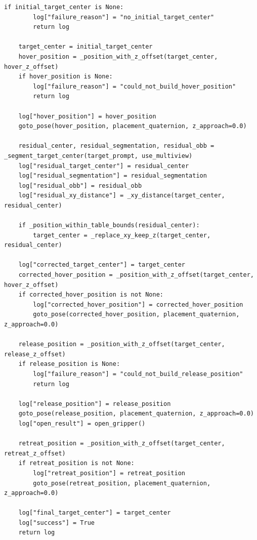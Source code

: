 \begin{lstlisting}[style=ratsappendixpython]
    if initial_target_center is None:
        log["failure_reason"] = "no_initial_target_center"
        return log

    target_center = initial_target_center
    hover_position = _position_with_z_offset(target_center, hover_z_offset)
    if hover_position is None:
        log["failure_reason"] = "could_not_build_hover_position"
        return log

    log["hover_position"] = hover_position
    goto_pose(hover_position, placement_quaternion, z_approach=0.0)

    residual_center, residual_segmentation, residual_obb = _segment_target_center(target_prompt, use_multiview)
    log["residual_target_center"] = residual_center
    log["residual_segmentation"] = residual_segmentation
    log["residual_obb"] = residual_obb
    log["residual_xy_distance"] = _xy_distance(target_center, residual_center)

    if _position_within_table_bounds(residual_center):
        target_center = _replace_xy_keep_z(target_center, residual_center)

    log["corrected_target_center"] = target_center
    corrected_hover_position = _position_with_z_offset(target_center, hover_z_offset)
    if corrected_hover_position is not None:
        log["corrected_hover_position"] = corrected_hover_position
        goto_pose(corrected_hover_position, placement_quaternion, z_approach=0.0)

    release_position = _position_with_z_offset(target_center, release_z_offset)
    if release_position is None:
        log["failure_reason"] = "could_not_build_release_position"
        return log

    log["release_position"] = release_position
    goto_pose(release_position, placement_quaternion, z_approach=0.0)
    log["open_result"] = open_gripper()

    retreat_position = _position_with_z_offset(target_center, retreat_z_offset)
    if retreat_position is not None:
        log["retreat_position"] = retreat_position
        goto_pose(retreat_position, placement_quaternion, z_approach=0.0)

    log["final_target_center"] = target_center
    log["success"] = True
    return log
\end{lstlisting}
